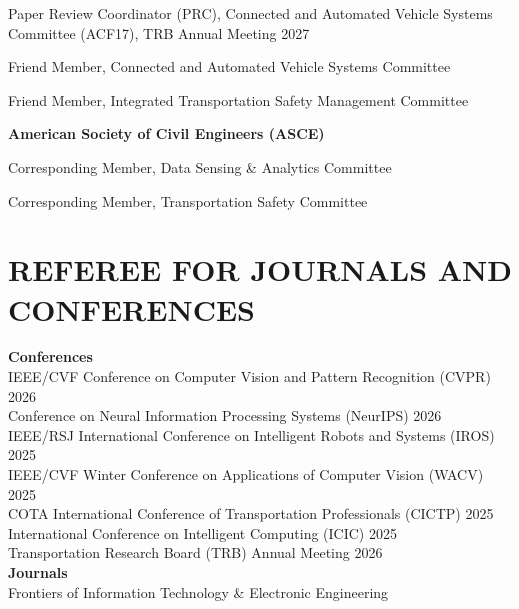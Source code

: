 \documentclass[letterpaper,11pt]{article}
\begin{document}
Paper Review Coordinator (PRC), Connected and Automated Vehicle Systems Committee (ACF17), TRB Annual Meeting 2027

Friend Member, Connected and Automated Vehicle Systems Committee

Friend Member, Integrated Transportation Safety Management Committee

\textbf{American Society of Civil Engineers (ASCE)}

Corresponding Member, Data Sensing \& Analytics Committee

Corresponding Member, Transportation Safety Committee

\vspace{10pt}
\section{\textbf{REFEREE FOR JOURNALS AND CONFERENCES}}

\textbf{Conferences}\\

\hspace{0.5cm}IEEE/CVF Conference on Computer Vision and Pattern Recognition (CVPR) 2026\\

\hspace{0.5cm}Conference on Neural Information Processing Systems (NeurIPS) 2026\\

\hspace{0.5cm}IEEE/RSJ International Conference on Intelligent Robots and Systems (IROS) 2025\\

\hspace{0.5cm}IEEE/CVF Winter Conference on Applications of Computer Vision (WACV) 2025\\

\hspace{0.5cm}COTA International Conference of Transportation Professionals (CICTP) 2025\\

\hspace{0.5cm}International Conference on Intelligent Computing (ICIC) 2025\\

\hspace{0.5cm}Transportation Research Board (TRB) Annual Meeting 2026\\

\textbf{Journals}\\

\hspace{0.5cm}Frontiers of Information Technology \& Electronic Engineering\





\end{document}
